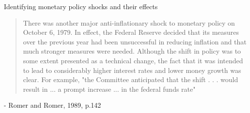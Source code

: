 

\begin{frame}{Identifying monetary policy shocks and their effects}

\begin{quotation}
There was another major anti-inflationary shock to monetary policy on October 6, 1979. In effect, the Federal Reserve decided that its measures over the previous year had been unsuccessful in reducing inflation and that much stronger measures were needed. Although the shift in policy was to some extent presented as a technical change, the fact that it was intended to lead to considerably higher interest rates and lower money growth was clear. For example, "the Committee anticipated that the shift . . . would result in ... a prompt increase ... in the federal funds rate"
\end{quotation}
\center - Romer and Romer, 1989, p.142

\end{frame}



